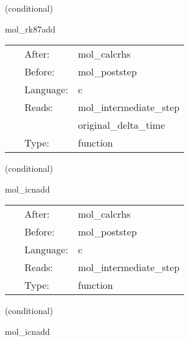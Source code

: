 \vspace{5mm}

   (conditional) 

\hspace{5mm} mol\_rk87add 

\hspace{5mm}{\it updates calculated with the runge-kutta 87 method } 


\hspace{5mm}

 \begin{tabular*}{160mm}{cll} 
~ & After:  & mol\_calcrhs \\ 
~ & Before:  & mol\_poststep \\ 
~ & Language:  & c \\ 
~ & Reads:  & mol\_intermediate\_step \\ 
~& ~ &original\_delta\_time\\ 
~ & Type:  & function \\ 
\end{tabular*} 


\vspace{5mm}

   (conditional) 

\hspace{5mm} mol\_icnadd 

\hspace{5mm}{\it updates calculated with the efficient icn method } 


\hspace{5mm}

 \begin{tabular*}{160mm}{cll} 
~ & After:  & mol\_calcrhs \\ 
~ & Before:  & mol\_poststep \\ 
~ & Language:  & c \\ 
~ & Reads:  & mol\_intermediate\_step \\ 
~ & Type:  & function \\ 
\end{tabular*} 


\vspace{5mm}

   (conditional) 

\hspace{5mm} mol\_icnadd 

\hspace{5mm}{\it updates calculated with the averaging icn method } 


